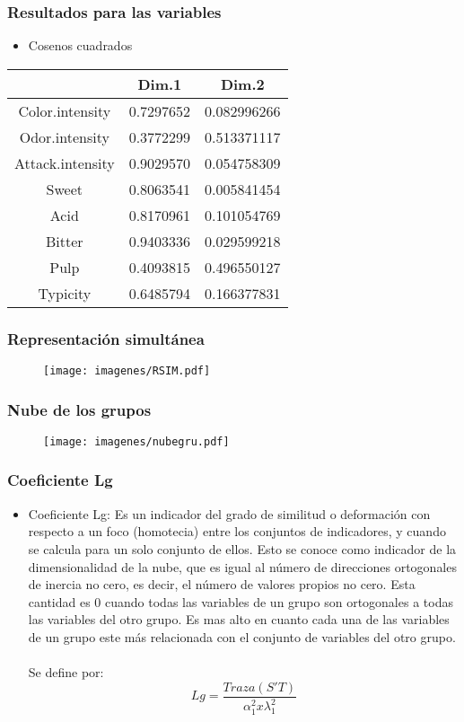 \documentclass[12pt]{beamer}
\begin{document}
\begin{frame}
\frametitle{Resultados para las variables}
\begin{itemize}
\item Cosenos cuadrados
\end{itemize}
\begin{center}
\begin{tabular}{|c|c|c|}
\hline
 & Dim.1  &     Dim.2 \\
\hline
Color.intensity & 0.7297652 &0.082996266 \\
Odor.intensity  & 0.3772299 &0.513371117\\
Attack.intensity& 0.9029570 &0.054758309\\
Sweet           & 0.8063541 &0.005841454\\
Acid            & 0.8170961 &0.101054769\\
Bitter          & 0.9403336 &0.029599218\\
Pulp            & 0.4093815 &0.496550127\\
Typicity        & 0.6485794 &0.166377831\\
\hline
\end{tabular}
\end{center}
\end{frame}

\begin{frame}
\frametitle{Representación simultánea}
\begin{figure}[h]
  \centering
  \texttt{[image: imagenes/RSIM.pdf]}
\end{figure}
\end{frame}

\begin{frame}
\frametitle{Nube de los grupos}
\begin{figure}[h]
  \centering
  \texttt{[image: imagenes/nubegru.pdf]}
\end{figure}
\end{frame}

\begin{frame}
\frametitle{Coeficiente Lg}
\begin{itemize}
\justifying
\item Coeficiente Lg: Es un indicador del grado de similitud o deformación con respecto a un foco (homotecia) entre los conjuntos
de indicadores, y cuando se calcula para un solo conjunto de ellos. Esto se conoce como indicador de la dimensionalidad de la nube, que es igual al número de direcciones ortogonales de inercia no cero, es decir, el número de valores propios no cero. Esta cantidad es 0 cuando todas las variables de un grupo son ortogonales a todas las variables del otro grupo. Es mas alto en cuanto cada una de las variables de un grupo este más relacionada con el conjunto de variables del otro grupo.
~\\Se define por:
$$Lg=\frac{Traza(S'T)}{\alpha_1^2 x \lambda_1^2}$$
\end{itemize}
\end{frame}
\end{document}
